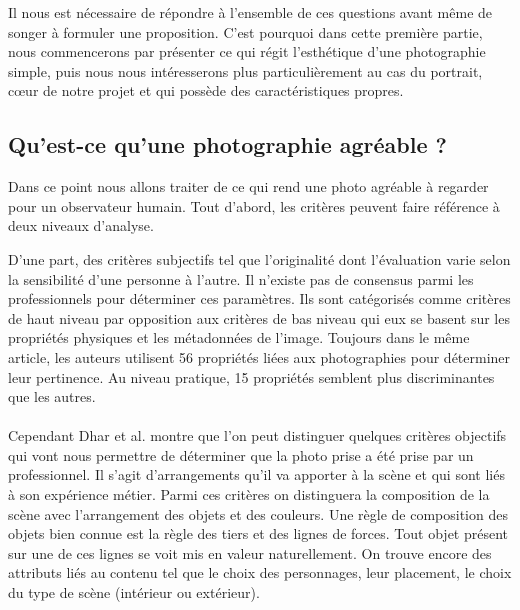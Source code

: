 \documentclass[11pt, french,screen]{report-rd-info}
\begin{document}
Il nous est nécessaire de répondre à l’ensemble de ces questions avant même de songer à formuler une proposition. C’est pourquoi dans cette première partie, nous commencerons par présenter ce qui régit l'esthétique d’une photographie simple, puis nous nous intéresserons plus particulièrement au cas du portrait, cœur de notre projet et qui possède des caractéristiques propres.
\subsection{Qu’est-ce qu’une photographie agréable ?}
Dans ce point nous allons traiter de ce qui rend une photo agréable à regarder pour un observateur humain. Tout d’abord, les critères peuvent faire référence à deux niveaux d'analyse.

D’une part, des critères subjectifs tel que l’originalité \cite{Datta} dont l’évaluation varie selon la sensibilité d’une personne à l’autre. Il n’existe pas de consensus parmi les professionnels pour déterminer ces paramètres. Ils sont catégorisés comme critères de haut niveau par opposition aux critères de bas niveau qui eux se basent sur les propriétés physiques et les métadonnées de l’image. Toujours dans le même article, les auteurs utilisent 56 propriétés liées aux photographies pour déterminer leur pertinence. Au niveau pratique, 15 propriétés semblent plus discriminantes que les autres.
\paragraph*{}
Cependant Dhar et al. \cite{Dhar} montre que l’on peut distinguer quelques critères objectifs qui vont nous permettre de déterminer que la photo prise a été prise par un professionnel. Il s’agit  d’arrangements qu’il va apporter à la scène et qui sont liés à son expérience métier. Parmi ces critères on distinguera la composition de la scène avec l'arrangement des objets et des couleurs. Une règle de composition des objets bien connue est la règle des tiers et des lignes de forces. Tout objet présent sur une de ces lignes se voit mis en valeur naturellement. On trouve encore des attributs liés au contenu tel que le choix des personnages, leur placement, le choix du type de scène (intérieur ou extérieur). 
\end{document}
